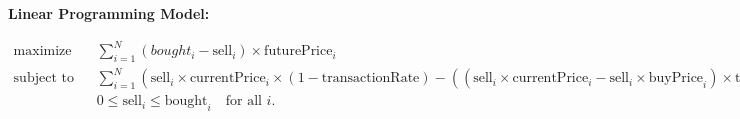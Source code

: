 \documentclass{article}
\begin{document}
\textbf{Linear Programming Model:}

\begin{align*}
\text{maximize} \quad & \sum_{i=1}^{N} (bought_i - \text{sell}_i) \times \text{futurePrice}_i \\
\text{subject to} \quad 
& \sum_{i=1}^{N} \left(\text{sell}_i \times \text{currentPrice}_i \times (1 - \text{transactionRate}) - \left(\left(\text{sell}_i \times \text{currentPrice}_i - \text{sell}_i \times \text{buyPrice}_i\right) \times \text{taxRate}\right)\right) \geq K, \\
& 0 \leq \text{sell}_i \leq \text{bought}_i \quad \text{for all } i.
\end{align*}
\end{document}
